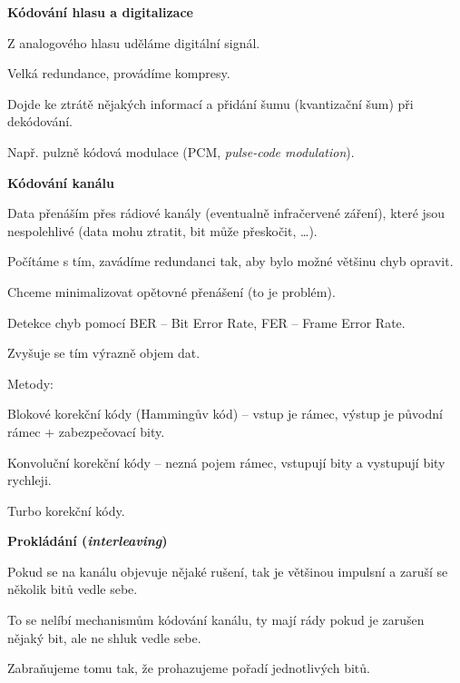 \begin{compactenum}
    \item \textbf{Kódování hlasu a digitalizace} \begin{compactitem}
        \item Z analogového hlasu uděláme digitální signál.
        \item Velká redundance, provádíme kompresy.
        \item Dojde ke ztrátě nějakých informací a přidání šumu (kvantizační šum) při dekódování.
        \item Např. pulzně kódová modulace (PCM, \textit{pulse-code modulation}).
    \end{compactitem}

    \item \textbf{Kódování kanálu} \begin{compactitem}
        \item Data přenáším přes rádiové kanály (eventualně infračervené záření), které jsou nespolehlivé (data mohu ztratit, bit může přeskočit, \dots).
        \item Počítáme s tím, zavádíme redundanci tak, aby bylo možné většinu chyb opravit. \begin{compactitem}
            \item Chceme minimalizovat opětovné přenášení (to je problém).
            \item Detekce chyb pomocí BER -- Bit Error Rate, FER -- Frame Error Rate.
        \end{compactitem}
        \item Zvyšuje se tím výrazně objem dat.
        \item Metody: \begin{compactitem}
            \item Blokové korekční kódy (Hammingův kód) -- vstup je rámec, výstup je původní rámec + zabezpečovací bity.
            \item Konvoluční korekční kódy -- nezná pojem rámec, vstupují bity a vystupují bity rychleji.
            \item Turbo korekční kódy.
        \end{compactitem}
    \end{compactitem}

    \item \textbf{Prokládání (\textit{interleaving})} \begin{compactitem}
        \item Pokud se na kanálu objevuje nějaké rušení, tak je většinou impulsní a zaruší se několik bitů vedle sebe.
        \item To se nelíbí mechanismům kódování kanálu, ty mají rády pokud je zarušen  nějaký bit, ale ne shluk vedle sebe.
        \item Zabraňujeme tomu tak, že prohazujeme pořadí jednotlivých bitů.
    \end{compactitem}


\end{compactenum}
